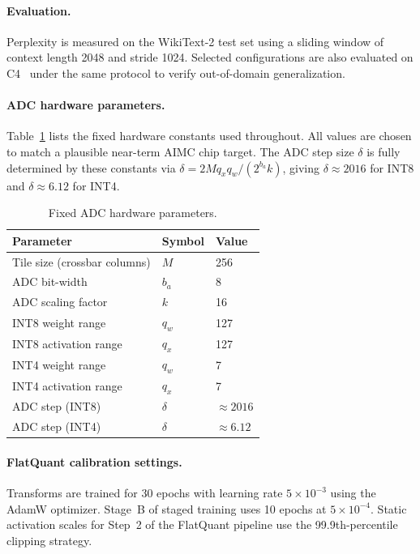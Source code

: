 \documentclass[a4paper,11pt,oneside]{article}
\theoremstyle{breakstyle}
\begin{document}
  \paragraph{Evaluation.}
  Perplexity is measured on the WikiText-2 test set using a sliding
  window of context length 2048 and stride 1024.
  Selected configurations are also evaluated on C4~\cite{c4}
  under the same protocol to verify out-of-domain generalization.

  \paragraph{ADC hardware parameters.}
  Table~\ref{tab:hardware} lists the fixed hardware constants used
  throughout.
  All values are chosen to match a plausible near-term AIMC chip
  target.
  The ADC step size $\delta$ is fully determined by these constants via
  $\delta = 2 M q_x q_w / (2^{b_a} k)$, giving $\delta \approx 2016$
  for INT8 and $\delta \approx 6.12$ for INT4.

  \begin{table}[htbp]
    \centering
    \caption{Fixed ADC hardware parameters.}
    \label{tab:hardware}
    \renewcommand{\arraystretch}{1.15}
    \begin{tabular}{@{}lll@{}}
      \toprule
      \textbf{Parameter} & \textbf{Symbol} & \textbf{Value} \\
      \midrule
      Tile size (crossbar columns) & $M$ & 256 \\
      ADC bit-width                & $b_a$ & 8 \\
      ADC scaling factor           & $k$ & 16 \\
      INT8 weight range            & $q_w$ & 127 \\
      INT8 activation range        & $q_x$ & 127 \\
      INT4 weight range            & $q_w$ & 7 \\
      INT4 activation range        & $q_x$ & 7 \\
      ADC step (INT8)              & $\delta$ & $\approx 2016$ \\
      ADC step (INT4)              & $\delta$ & $\approx 6.12$ \\
      \bottomrule
    \end{tabular}
  \end{table}

  \paragraph{FlatQuant calibration settings.}
  Transforms are trained for 30 epochs with learning rate $5 \times
  10^{-3}$ using the AdamW optimizer.
  Stage~B of staged training uses 10 epochs at $5 \times 10^{-4}$.
  Static activation scales for Step~2 of the FlatQuant pipeline use the
  99.9th-percentile clipping strategy.
\end{document}
